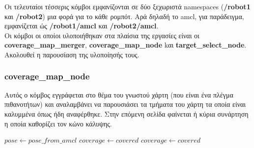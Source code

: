 Οι τελευταίοι τέσσερις κόμβοι εμφανίζονται σε δύο ξεχωριστά namespaces (\textbf{/robot1} και \textbf{/robot2}) μια φορά για το κάθε ρομπότ. Αρά δηλαδή το amcl, για παράδειγμα, εμφανίζεται ώς \textbf{/robot1/amcl} και \textbf{/robot2/amcl}. \\
Οι κόμβοι οι οποίοι υλοποιήθηκαν στα πλαίσια της εργασίες είναι οι \textbf{coverage\_map\_merger}, \textbf{coverage\_map\_node} kαι \textbf{target\_select\_node}. Ακολουθεί η παρουσίαση της υλοποίησής τους.


\subsubsection{coverage\_map\_node} Αυτός ο κόμβος εγγράφεται στο θέμα του γνωστού χάρτη (που είναι ένα πλέγμα πιθανοτήτων) και αναλαμβάνει να παρουσιάσει τα τμήματα του χάρτη τα οποία είναι καλυμμένα όπως ήδη αναφέρθηκε. Στην επόμενη σελίδα φαίνεται ή κύρια συνάρτηση η οποία καθορίζει τον κώνο κάλυψης. 

\newpage

\begin{algorithmic}
	\State $pose \gets pose\_from\_amcl$
		\State $coverage \gets covered $
	\EndFor
			\State $coverage \gets covered $
		\EndFor
	\EndFor		
\end{algorithmic}


	
	 
	
